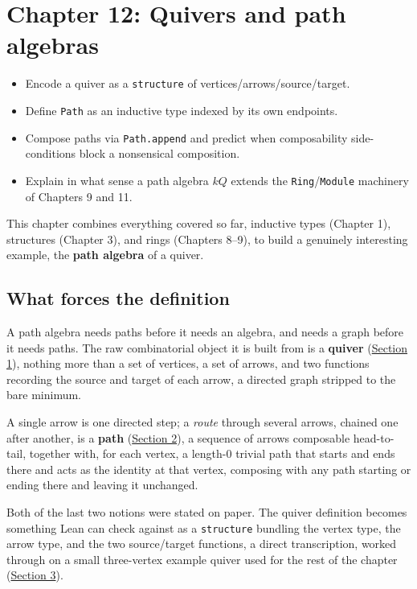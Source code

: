 \chapter{Chapter 12: Quivers and path algebras}\label{sec:12-path-algebras:00-index:1}

\begin{learningobjectives}
\begin{itemize}
\tightlist
\item
  Encode a quiver as a \texttt{structure} of vertices/arrows/source/target.
\item
  Define \texttt{Path} as an inductive type indexed by its own endpoints.
\item
  Compose paths via \texttt{Path.append} and predict when composability side-conditions block a nonsensical composition.
\item
  Explain in what sense a path algebra \(kQ\) extends the \texttt{Ring}/\texttt{Module} machinery of Chapters 9 and 11.
\end{itemize}
\end{learningobjectives}


This chapter combines everything covered so far, inductive types (Chapter 1), structures (Chapter 3), and rings (Chapters 8--9), to build a genuinely interesting example, the \textbf{path algebra} of a quiver.

\section{What forces the definition}\label{sec:12-path-algebras:00-index:2}

A path algebra needs paths before it needs an algebra, and needs a graph before it needs paths. The raw combinatorial object it is built from is a \textbf{quiver} (\hyperref[sec:12-path-algebras:01-what-is-a-quiver:1]{Section 1}), nothing more than a set of vertices, a set of arrows, and two functions recording the source and target of each arrow, a directed graph stripped to the bare minimum.

A single arrow is one directed step; a \emph{route} through several arrows, chained one after another, is a \textbf{path} (\hyperref[sec:12-path-algebras:02-paths:1]{Section 2}), a sequence of arrows composable head-to-tail, together with, for each vertex, a length-\(0\) trivial path that starts and ends there and acts as the identity at that vertex, composing with any path starting or ending there and leaving it unchanged.

Both of the last two notions were stated on paper. The quiver definition becomes something Lean can check against as a \texttt{structure} bundling the vertex type, the arrow type, and the two source/target functions, a direct transcription, worked through on a small three-vertex example quiver used for the rest of the chapter (\hyperref[sec:12-path-algebras:03-defining-a-quiver:1]{Section 3}).

